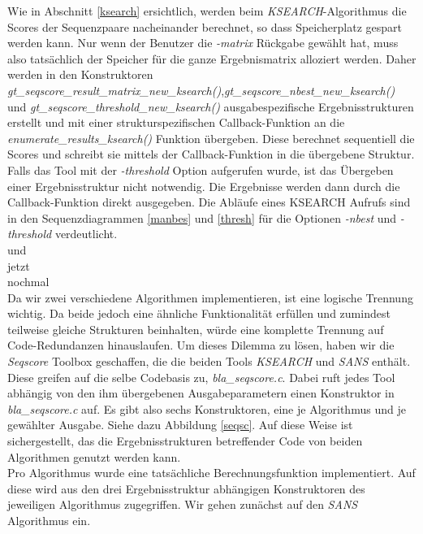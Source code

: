 \documentclass{article}
\begin{document}
Wie in Abschnitt \ref{ksearch} ersichtlich, werden beim \emph{KSEARCH}-Algorithmus die Scores der Sequenzpaare nacheinander berechnet, so dass Speicherplatz gespart werden kann. Nur wenn der Benutzer die \emph{-matrix} Rückgabe gewählt hat, muss also tatsächlich der Speicher für die ganze Ergebnismatrix alloziert werden. Daher werden in den Konstruktoren \emph{gt\_seqscore\_result\_matrix\_new\_ksearch()},\linebreak \emph{gt\_seqscore\_nbest\_new\_ksearch()} und  \emph{gt\_seqscore\_threshold\_new\_ksearch()} ausgabespezifische Ergebnisstrukturen erstellt und mit einer strukturspezifischen Call\-back-Funktion an 
die \emph{enumerate\_results\_ksearch()} Funktion übergeben. Diese berechnet sequentiell die Scores und schreibt sie mittels der Callback-Funktion in die übergebene Struktur. Falls das Tool mit der \emph{-threshold} Option aufgerufen wurde, ist das Übergeben einer Ergebnisstruktur nicht notwendig. Die Ergebnisse werden dann durch die Callback-Funktion direkt ausgegeben. Die Abläufe eines KSEARCH Aufrufs sind in den Sequenzdiagrammen \ref{manbes} und \ref{thresh} für die Optionen \emph{-nbest} und \emph{-threshold} verdeutlicht. \\

und\\
jetzt\\
nochmal\\

Da wir zwei verschiedene Algorithmen implementieren, ist eine logische Trennung wichtig. Da beide jedoch eine ähnliche Funktionalität erfüllen und
zumindest teilweise gleiche Strukturen beinhalten, würde eine komplette Trennung auf Code-Redundanzen hinauslaufen. Um dieses Dilemma zu lösen, haben wir
die \emph{Seqscore} Toolbox geschaffen, die die beiden Tools \emph{KSEARCH} und \emph{SANS} enthält. Diese greifen auf die selbe Codebasis zu, 
\emph{bla\_seqscore.c}. Dabei ruft jedes Tool abhängig von den ihm übergebenen Ausgabeparametern einen Konstruktor in \emph{bla\_seqscore.c} auf. Es gibt also
sechs Konstruktoren, eine je Algorithmus und je gewählter Ausgabe. Siehe dazu Abbildung \ref{seqsc}. Auf diese Weise ist sichergestellt, das die 
Ergebnisstrukturen betreffender Code von beiden Algorithmen genutzt werden kann.\\
Pro Algorithmus wurde eine tatsächliche Berechnungsfunktion implementiert. Auf diese wird aus den drei Ergebnisstruktur abhängigen Konstruktoren des jeweiligen
Algorithmus zugegriffen. Wir gehen zunächst auf den \emph{SANS} Algorithmus ein.
\end{document}
